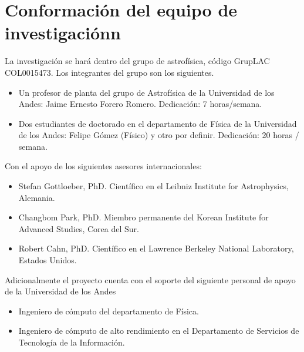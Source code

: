 \section{Conformaci\'on del equipo de investigaci\'onn}

La investigaci\'on se har\'a dentro del grupo de astrof\'isica,
c\'odigo GrupLAC COL0015473. Los integrantes del grupo son los siguientes.


\begin{itemize}
\item Un profesor de planta del grupo de Astrof\'isica de la
  Universidad de los Andes: Jaime Ernesto  Forero Romero.
  Dedicaci\'on: 7 horas/semana.
\item Dos estudiantes de doctorado en el departamento de F\'isica de
  la Universidad de los Andes: Felipe G\'omez (F\'isico) y otro por
  definir.  Dedicaci\'on: 20 horas / semana.
\end{itemize}

\noindent
Con el apoyo de los siguientes asesores internacionales:

\begin{itemize}

\item Stefan Gottloeber, PhD. Cient\'ifico en el Leibniz Institute for
  Astrophysics, Alemania.  
\item Changbom Park, PhD. Miembro permanente del Korean Institute for
  Advanced Studies, Corea del Sur. 
\item Robert Cahn, PhD. Cient\'ifico en el Lawrence Berkeley National
  Laboratory, Estados   Unidos. 
\end{itemize}

\noindent
Adicionalmente el proyecto cuenta con el soporte del siguiente
personal de apoyo de la Universidad de los Andes 

\begin{itemize}
\item{Ingeniero de c\'omputo del departamento de F\'isica.}
\item{Ingeniero de c\'omputo de alto rendimiento en el Departamento de
  Servicios de Tecnolog\'ia de la Informaci\'on}. 
\end{itemize}
